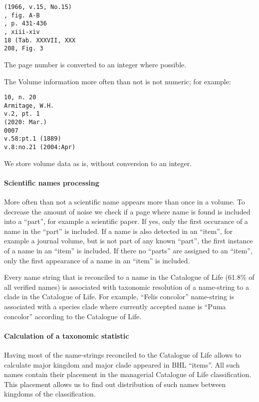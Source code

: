 \documentclass[
]{article}
\begin{document}
\begin{verbatim}
(1966, v.15, No.15)
, fig. A-B
, p. 431-436
, xiii-xiv
18 (Tab. XXXVII, XXX
208, Fig. 3
\end{verbatim}

The page number is converted to an integer where possible.

The Volume information more often than not is not numeric; for example:

\begin{verbatim}
10, n. 20
Armitage, W.H.
v.2, pt. 1
(2020: Mar.)
0007
v.58:pt.1 (1889)
v.8:no.21 (2004:Apr)
\end{verbatim}

We store volume data as is, without conversion to an integer.

\hypertarget{scientific-names-processing}{%
\paragraph{Scientific names
processing}\label{scientific-names-processing}}

More often than not a scientific name appears more than once in a
volume. To decrease the amount of noise we check if a page where name is
found is included into a ``part'', for example a scientific paper. If
yes, only the first occurance of a name in the ``part'' is included. If
a name is also detected in an ``item'', for example a journal volume,
but is not part of any known ``part'', the first instance of a name in
an ``item'' is included. If there no ``parts'' are assigned to an
``item'', only the first appearance of a name in an ``item'' is
included.

Every name string that is reconciled to a name in the Catalogue of Life
(61.8\% of all verified names) is associated with taxonomic resolution
of a name-string to a clade in the Catalogue of Life. For example,
``Felis concolor'' name-string is associated with a species clade where
currently accepted name is ``Puma concolor'' according to the Catalogue
of Life.

\hypertarget{calculation-of-a-taxonomic-statistic}{%
\paragraph{Calculation of a taxonomic
statistic}\label{calculation-of-a-taxonomic-statistic}}

Having most of the name-strings reconciled to the Catalogue of Life
allows to calculate major kingdom and major clade appeared in BHL
``items''. All such names contain their placement in the managerial
Catalogue of Life classification. This placement allows us to find out
distribution of such names between kingdoms of the classification.
\end{document}
